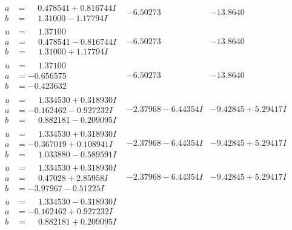 \documentclass[1p]{elsarticle_modified}
\theoremstyle{definition}
\begin{document}
$$\begin{array}{c|c|c}
\begin{aligned}
a &= \phantom{-}0.478541 + 0.816744 I \\
b &= \phantom{-}1.31000 - 1.17794 I\end{aligned}
 & -6.50273\phantom{ +0.000000I} & -13.8640\phantom{ +0.000000I} \\ \hline\begin{aligned}
u &= \phantom{-}1.37100\phantom{ +0.000000I} \\
a &= \phantom{-}0.478541 - 0.816744 I \\
b &= \phantom{-}1.31000 + 1.17794 I\end{aligned}
 & -6.50273\phantom{ +0.000000I} & -13.8640\phantom{ +0.000000I} \\ \hline\begin{aligned}
u &= \phantom{-}1.37100\phantom{ +0.000000I} \\
a &= -0.656575\phantom{ +0.000000I} \\
b &= -0.423632\phantom{ +0.000000I}\end{aligned}
 & -6.50273\phantom{ +0.000000I} & -13.8640\phantom{ +0.000000I} \\ \hline\begin{aligned}
u &= \phantom{-}1.334530 + 0.318930 I \\
a &= -0.162462 - 0.927232 I \\
b &= \phantom{-}0.882181 - 0.209095 I\end{aligned}
 & -2.37968 - 6.44354 I & -9.42845 + 5.29417 I \\ \hline\begin{aligned}
u &= \phantom{-}1.334530 + 0.318930 I \\
a &= -0.367019 + 0.108941 I \\
b &= \phantom{-}1.033880 - 0.589591 I\end{aligned}
 & -2.37968 - 6.44354 I & -9.42845 + 5.29417 I \\ \hline\begin{aligned}
u &= \phantom{-}1.334530 + 0.318930 I \\
a &= \phantom{-}0.47028 + 2.85958 I \\
b &= -3.97967 - 0.51225 I\end{aligned}
 & -2.37968 - 6.44354 I & -9.42845 + 5.29417 I \\ \hline\begin{aligned}
u &= \phantom{-}1.334530 - 0.318930 I \\
a &= -0.162462 + 0.927232 I \\
b &= \phantom{-}0.882181 + 0.209095 I\end{aligned}

\end{array}$$
\end{document}
